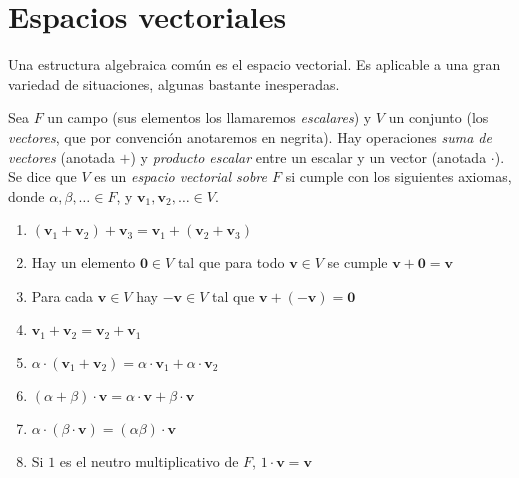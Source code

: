 %

\section{Espacios vectoriales}
\label{sec:espacios-vectoriales}

  Una estructura algebraica común es el espacio vectorial.
  Es aplicable a una gran variedad de situaciones,
  algunas bastante inesperadas.
  \begin{definition}
    Sea \(F\) un campo
    (sus elementos los llamaremos \emph{escalares})%
    y \(V\) un conjunto
    (los \emph{vectores},%
     que por convención anotaremos en negrita).
    Hay operaciones \emph{suma de vectores}%
    (anotada \(+\))
    y \emph{producto escalar}
    entre un escalar y un vector
    (anotada \(\cdot\)).
    Se dice que \(V\) es un \emph{espacio vectorial sobre \(F\)}
    si cumple con los siguientes axiomas,%
    donde \(\alpha, \beta, \dotsc \in F\),
    y \(\boldsymbol{v}_1, \boldsymbol{v}_2, \dotsc \in V\).
    \begin{enumerate}[label=\textbf{V\arabic{*}:}, ref=V\arabic{*}]
    \item\label{ax:V:associative}
      \((\boldsymbol{v}_1 + \boldsymbol{v}_2) + \boldsymbol{v}_3
	   = \boldsymbol{v}_1
	       + (\boldsymbol{v}_2
	       + \boldsymbol{v}_3)\)
    \item\label{ax:V:neutral}
      Hay un elemento \(\boldsymbol{0} \in V\)
      tal que para todo \(\boldsymbol{v} \in V\)
      se cumple
      \(\boldsymbol{v} + \boldsymbol{0} = \boldsymbol{v}\)
    \item\label{ax:V:inverse}
      Para cada \(\boldsymbol{v} \in V\)
      hay \(- \boldsymbol{v} \in V\)
      tal que \(\boldsymbol{v} + (- \boldsymbol{v})
		  = \boldsymbol{0}\)
    \item\label{ax:V:commutative}
       \(\boldsymbol{v}_1 + \boldsymbol{v}_2
	   = \boldsymbol{v}_2 + \boldsymbol{v}_1\)
    \item\label{ax:V:scalar(vectorsum)}
      \(\alpha \cdot ( \boldsymbol{v}_1 + \boldsymbol{v}_2 )
	  = \alpha \cdot \boldsymbol{v}_1
	      + \alpha \cdot \boldsymbol{v}_2\)
    \item\label{ax:V:(scalarsum)vector}
      \((\alpha + \beta) \cdot \boldsymbol{v}
	  = \alpha \cdot \boldsymbol{v}
	      + \beta \cdot \boldsymbol{v}\)
    \item\label{ax:V:scalar-scalar-vector}
      \(\alpha \cdot (\beta \cdot \boldsymbol{v})
	  = (\alpha \beta) \cdot \boldsymbol{v}\)
     \item\label{ax:V:1-vector}
       Si \(1\) es el neutro multiplicativo de \(F\),
       \(1 \cdot \boldsymbol{v} = \boldsymbol{v}\)
    \end{enumerate}
  \end{definition}
